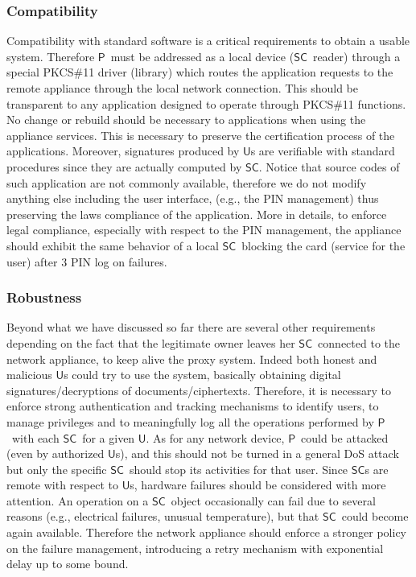 \documentclass{sig-alternate}
\newcommand{\User}{\ensuremath{\mathsf{U}}}
\newcommand{\Proxy}{\ensuremath{\mathsf{P}}}
\newcommand{\SC}{\ensuremath{\mathsf{SC}}}
\begin{document}
\subsubsection{Compatibility} Compatibility with standard software is a critical requirements to obtain a usable system. Therefore \Proxy\ must be addressed as a local device (\SC\ reader) through a special PKCS\#11 driver (library) which routes the application requests to the remote appliance through the local network connection. This should be transparent to any application designed to operate through PKCS\#11 functions. No change or rebuild should be necessary to applications when using the appliance services. This is necessary to preserve the certification process of the applications. Moreover, signatures produced by \User s are verifiable with standard procedures since they are actually computed by \SC. Notice that source codes of such application are not commonly available, therefore
we do not modify anything else including the user interface, (e.g., the PIN management) thus preserving the laws compliance of the application. More in details, to enforce legal compliance, especially with respect to the PIN management, the appliance should exhibit the same behavior of a local \SC\ blocking the card (service for the user) after $3$ PIN log on failures.

\subsubsection{Robustness}
Beyond what we have discussed so far there are several other requirements depending on the fact that the legitimate owner leaves her \SC\  connected to the network appliance, to keep alive the proxy system. Indeed both honest and malicious \User s could try to use the system, basically obtaining digital signatures/decryptions of documents/ciphertexts. Therefore, it is necessary to enforce strong authentication and  tracking mechanisms to identify users, to manage privileges and to meaningfully log all the operations performed by \Proxy\ with each \SC\ for a given \User.
As for any network device, \Proxy\ could be attacked (even by authorized \User s), and this should not be turned in a general DoS attack but only the specific \SC\
should stop its activities for that  user.
Since \SC s  are remote with respect to \User s, hardware failures should be considered with more attention. An operation on a \SC \ object occasionally can fail due to several reasons (e.g., electrical failures, unusual temperature), but that \SC \ could become again available. Therefore the network appliance should enforce a stronger policy on the failure management, introducing a retry mechanism with exponential delay up to some bound.
\end{document}
